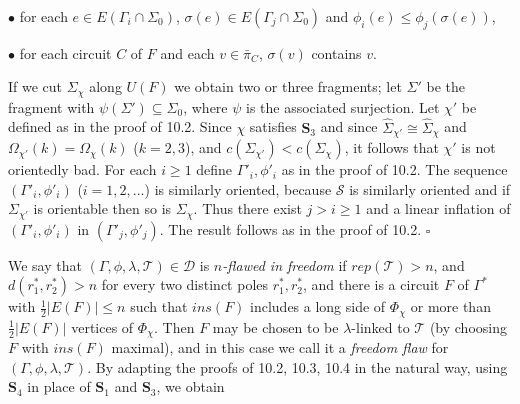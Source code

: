 \hspace*{12pt}$\bullet$ for each $e \in E(\Gamma_i \cap \Sigma_0)$, $\sigma(e) \in E(\Gamma_j \cap \Sigma_0)$ and $\phi_i(e) \le \phi_j(\sigma(e))$,

\hspace*{12pt}$\bullet$ for each circuit $C$ of $F$ and each $v \in \bar{\pi}_C$, $\sigma(v)$ contains $v$.

If we cut $\Sigma_\chi$ along $U(F)$ we obtain two or three fragments; let $\Sigma'$ be the fragment with $\psi(\Sigma') \subseteq \Sigma_0$, where $\psi$ is the associated surjection. Let $\chi'$ be defined as in the proof of 10.2. Since $\chi$ satisfies $\mathbf{S}_3$ and since $\hat{\Sigma}_{\chi'} \cong \hat{\Sigma}_\chi$ and $\Omega_{\chi'}(k) = \Omega_\chi(k)$ ($k = 2, 3$), and $c(\Sigma_{\chi'}) < c(\Sigma_\chi)$, it follows that $\chi'$ is not orientedly bad. For each $i \ge 1$ define $\Gamma'_i, \phi'_i$ as in the proof of 10.2. The sequence $(\Gamma'_i, \phi'_i)$ ($i = 1, 2, \dots$) is similarly oriented, because $\mathscr{S}$ is similarly oriented and if $\Sigma_{\chi'}$ is orientable then so is $\Sigma_\chi$. Thus there exist $j > i \ge 1$ and a linear inflation of $(\Gamma'_i, \phi'_i)$ in $(\Gamma'_j, \phi'_j)$. The result follows as in the proof of 10.2. $\square$

We say that $(\Gamma, \phi, \lambda, \mathscr{T}) \in \mathscr{D}$ is \textit{$n$-flawed in freedom} if $rep(\mathscr{T}) > n$, and $d(r^*_1, r^*_2) > n$ for every two distinct poles $r^*_1, r^*_2$, and there is a circuit $F$ of $\Gamma^*$ with $\frac{1}{2}|E(F)| \le n$ such that $ins(F)$ includes a long side of $\Phi_\chi$ or more than $\frac{1}{2}|E(F)|$ vertices of $\Phi_\chi$. Then $F$ may be chosen to be $\lambda$-linked to $\mathscr{T}$ (by choosing $F$ with $ins(F)$ maximal), and in this case we call it a \textit{freedom flaw} for $(\Gamma, \phi, \lambda, \mathscr{T})$. By adapting the proofs of 10.2, 10.3, 10.4 in the natural way, using $\mathbf{S}_4$ in place of $\mathbf{S}_1$ and $\mathbf{S}_3$, we obtain

